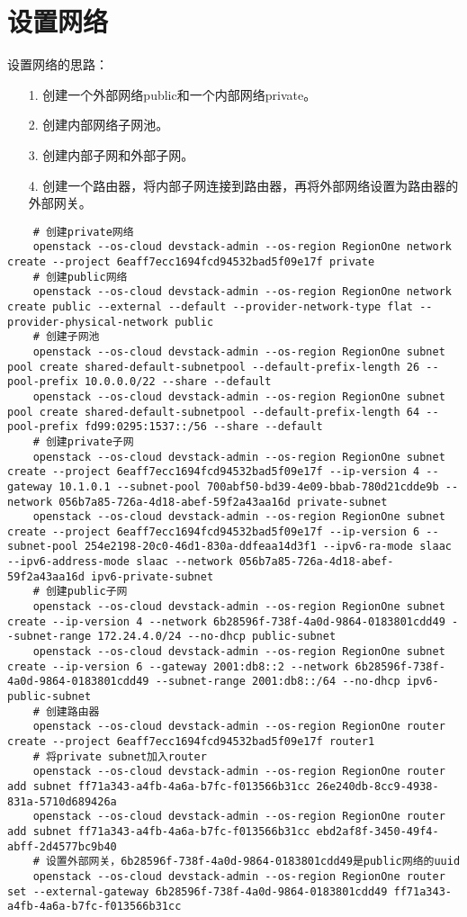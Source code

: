 \documentclass[a4paper,left=1.5cm,right=1.5cm,11pt]{article}
\begin{document}
\section{设置网络}

	设置网络的思路：
	\begin{itemize}
		\item[1.] 创建一个外部网络public和一个内部网络private。
		\item[2.] 创建内部网络子网池。
		\item[3.] 创建内部子网和外部子网。
		\item[4.] 创建一个路由器，将内部子网连接到路由器，再将外部网络设置为路由器的外部网关。
	\end{itemize}

	\begin{lstlisting}
	# 创建private网络
	openstack --os-cloud devstack-admin --os-region RegionOne network create --project 6eaff7ecc1694fcd94532bad5f09e17f private
	# 创建public网络
	openstack --os-cloud devstack-admin --os-region RegionOne network create public --external --default --provider-network-type flat --provider-physical-network public
	# 创建子网池
	openstack --os-cloud devstack-admin --os-region RegionOne subnet pool create shared-default-subnetpool --default-prefix-length 26 --pool-prefix 10.0.0.0/22 --share --default
	openstack --os-cloud devstack-admin --os-region RegionOne subnet pool create shared-default-subnetpool --default-prefix-length 64 --pool-prefix fd99:0295:1537::/56 --share --default
	# 创建private子网
	openstack --os-cloud devstack-admin --os-region RegionOne subnet create --project 6eaff7ecc1694fcd94532bad5f09e17f --ip-version 4 --gateway 10.1.0.1 --subnet-pool 700abf50-bd39-4e09-bbab-780d21cdde9b --network 056b7a85-726a-4d18-abef-59f2a43aa16d private-subnet
	openstack --os-cloud devstack-admin --os-region RegionOne subnet create --project 6eaff7ecc1694fcd94532bad5f09e17f --ip-version 6 --subnet-pool 254e2198-20c0-46d1-830a-ddfeaa14d3f1 --ipv6-ra-mode slaac --ipv6-address-mode slaac --network 056b7a85-726a-4d18-abef-59f2a43aa16d ipv6-private-subnet
	# 创建public子网
	openstack --os-cloud devstack-admin --os-region RegionOne subnet create --ip-version 4 --network 6b28596f-738f-4a0d-9864-0183801cdd49 --subnet-range 172.24.4.0/24 --no-dhcp public-subnet
	openstack --os-cloud devstack-admin --os-region RegionOne subnet create --ip-version 6 --gateway 2001:db8::2 --network 6b28596f-738f-4a0d-9864-0183801cdd49 --subnet-range 2001:db8::/64 --no-dhcp ipv6-public-subnet
	# 创建路由器
	openstack --os-cloud devstack-admin --os-region RegionOne router create --project 6eaff7ecc1694fcd94532bad5f09e17f router1
	# 将private subnet加入router
	openstack --os-cloud devstack-admin --os-region RegionOne router add subnet ff71a343-a4fb-4a6a-b7fc-f013566b31cc 26e240db-8cc9-4938-831a-5710d689426a
	openstack --os-cloud devstack-admin --os-region RegionOne router add subnet ff71a343-a4fb-4a6a-b7fc-f013566b31cc ebd2af8f-3450-49f4-abff-2d4577bc9b40
	# 设置外部网关，6b28596f-738f-4a0d-9864-0183801cdd49是public网络的uuid
	openstack --os-cloud devstack-admin --os-region RegionOne router set --external-gateway 6b28596f-738f-4a0d-9864-0183801cdd49 ff71a343-a4fb-4a6a-b7fc-f013566b31cc
	\end{lstlisting}
\end{document}
